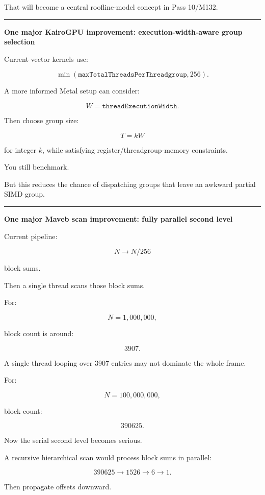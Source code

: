 That will become a central roofline-model concept in Pass 10/M132.

\begin{center}\rule{0.5\linewidth}{0.5pt}\end{center}

\textbf{One major KairoGPU improvement: execution-width-aware group selection}

Current vector kernels use:

\[
\min(
\texttt{maxTotalThreadsPerThreadgroup},
256
).
\]

A more informed Metal setup can consider:

\[
W=
\texttt{threadExecutionWidth}.
\]

Then choose group size:

\[
T=kW
\]

for integer \(k\), while satisfying register/threadgroup-memory constraints.

You still benchmark.

But this reduces the chance of dispatching groups that leave an awkward partial SIMD group.

\begin{center}\rule{0.5\linewidth}{0.5pt}\end{center}

\textbf{One major Maveb scan improvement: fully parallel second level}

Current pipeline:

\[
N
\rightarrow
N/256
\]

block sums.

Then a single thread scans those block sums.

For:

\[
N=1,000,000,
\]

block count is around:

\[
3907.
\]

A single thread looping over 3907 entries may not dominate the whole frame.

For:

\[
N=100,000,000,
\]

block count:

\[
390625.
\]

Now the serial second level becomes serious.

A recursive hierarchical scan would process block sums in parallel:

\[
390625
\rightarrow
1526
\rightarrow
6
\rightarrow
1.
\]

Then propagate offsets downward.

